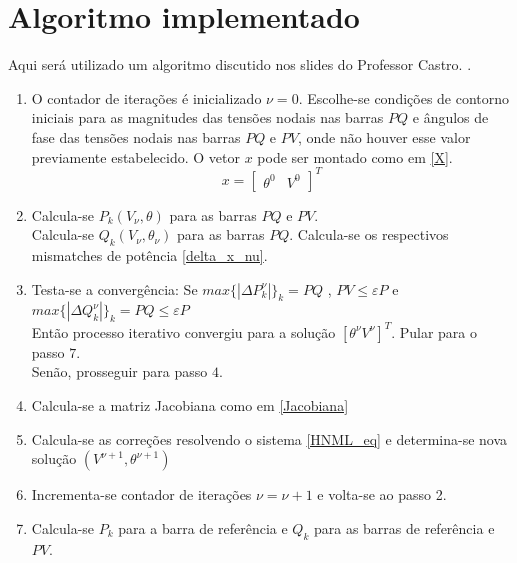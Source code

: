 \section{Algoritmo implementado}

Aqui será utilizado um algoritmo discutido nos slides do Professor Castro. \cite{castro}.

\begin{enumerate}
    \item   O contador de iterações é inicializado $\nu = 0$.   Escolhe-se condições de contorno iniciais para as magnitudes das tensões nodais nas barras $PQ$ e ângulos de fase das tensões nodais nas barras $PQ$ e $PV$, onde não houver esse valor previamente estabelecido.
            O vetor $x$ pode ser montado como em \ref{X}.
            \begin{equation}
            x  = \left[ \begin{matrix} \theta^0 & V^0  \end{matrix} \right]^T 
            \label{X}
            \end{equation}
    \item   Calcula-se $P_k(V_\nu, \theta)$ para as barras $PQ$ e $PV$.\\
            Calcula-se $Q_k(V_\nu, \theta_\nu)$ para as barras $PQ$.
            Calcula-se os respectivos mismatches de potência \ref{delta_x_nu}.
    \item   Testa-se a convergência: Se $max \{|\Delta P_k^\nu|\}_k=PQ$ , $PV\leq \varepsilon P$ e $max \{|\Delta Q_k^\nu|\}_k=PQ \leq \varepsilon P$\\
            Então processo iterativo convergiu para a solução $[\theta ^\nu V^\nu]^T$. Pular para o passo $7$.\\
            Senão, prosseguir para passo $4$.
    \item   Calcula-se a matriz Jacobiana como em \ref{Jacobiana}
    \item   Calcula-se as correções resolvendo o sistema \ref{HNML_eq} e determina-se nova solução $(V^{\nu + 1},\theta^{\nu + 1})$
    \item   Incrementa-se contador de iterações $\nu = \nu + 1$ e volta-se ao passo 2.
    \item   Calcula-se $P_k$ para a barra de referência e $Q_k$ para as barras de referência e $PV$.
\end{enumerate}

